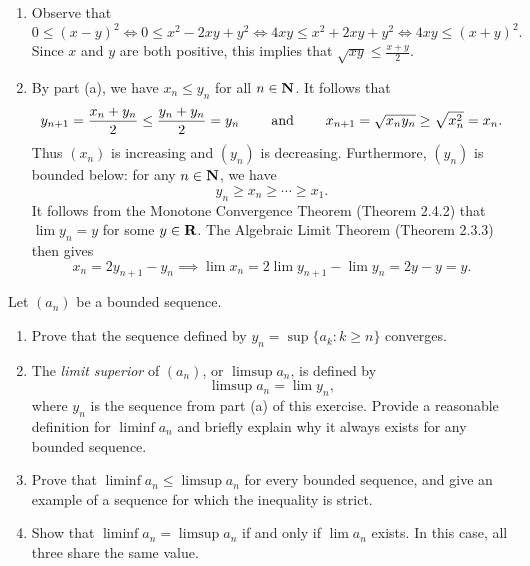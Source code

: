 \documentclass{lew98_solutions}
\begin{document}
\begin{solution}
    \begin{enumerate}
        \item Observe that
        \[
            0 \leq (x - y)^2 \iff 0 \leq x^2 - 2xy + y^2 \iff 4xy \leq x^2 + 2xy + y^2 \iff 4xy \leq (x + y)^2.
        \]
        Since \( x \) and \( y \) are both positive, this implies that \( \sqrt{xy} \leq \tfrac{x + y}{2} \).

        \item By part (a), we have \( x_n \leq y_n \) for all \( n \in \N \). It follows that
        \[
            y_{n+1} = \frac{x_n + y_n}{2} \leq \frac{y_n + y_n}{2} = y_n \hspaceand[8mm] x_{n+1} = \sqrt{x_n y_n} \geq \sqrt{x_n^2} = x_n.
        \]
        Thus \( (x_n) \) is increasing and \( (y_n) \) is decreasing. Furthermore, \( (y_n) \) is bounded below: for any \( n \in \N \), we have
        \[
            y_n \geq x_n \geq \cdots \geq x_1.
        \]
        It follows from the Monotone Convergence Theorem (Theorem 2.4.2) that \( \lim y_n = y \) for some \( y \in \R \). The Algebraic Limit Theorem (Theorem 2.3.3) then gives
        \[
            x_n = 2 y_{n+1} - y_n \implies \lim x_n = 2 \lim y_{n+1} - \lim y_n = 2 y - y = y.
        \]
    \end{enumerate}
\end{solution}

\begin{exercise}
\label{ex:2.4.7}
    Let \( (a_n) \) be a bounded sequence.
    \begin{enumerate}
        \item Prove that the sequence defined by \( y_n = \sup \{ a_k : k \geq n \} \) converges.

        \item The \textit{limit superior} of \( (a_n) \), or \( \limsup a_n \), is defined by
        \[
            \limsup a_n = \lim y_n,
        \]
        where \( y_n \) is the sequence from part (a) of this exercise. Provide a reasonable definition for \( \liminf a_n \) and briefly explain why it always exists for any bounded sequence.

        \item Prove that \( \liminf a_n \leq \limsup a_n \) for every bounded sequence, and give an example of a sequence for which the inequality is strict.

        \item Show that \( \liminf a_n = \limsup a_n \) if and only if \( \lim a_n \) exists. In this case, all three share the same value.
    \end{enumerate}
\end{exercise}
\end{document}
